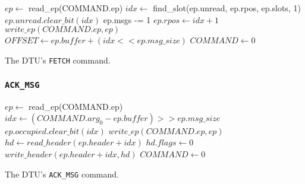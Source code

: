 \documentclass[a4paper,11pt,draft]{article}
\begin{document}
\begin{algorithm}[H]
    $ep \gets$ read\_ep(COMMAND.ep)\;
    \BlankLine
    $idx \gets$ find\_slot(ep.unread, ep.rpos, ep.slots, 1)\;
    $ep.unread.clear\_bit(idx)$\;
    ep.msgs -= 1\;
    $ep.rpos \gets idx + 1$\;
    $write\_ep(COMMAND.ep, ep)$\;
    \BlankLine
    $OFFSET \gets ep.buffer + (idx << ep.msg\_size)$\;
    $COMMAND \gets 0$\;
    \caption{The DTU's \texttt{FETCH} command.}
\end{algorithm}

\subsubsection{\texttt{ACK\_MSG}}

\begin{algorithm}[H]
    $ep \gets$ read\_ep(COMMAND.ep)\;
    \BlankLine
    $idx \gets (COMMAND.arg_0 - ep.buffer) >> ep.msg\_size$\;
    $ep.occupied.clear\_bit(idx)$\;
    $write\_ep(COMMAND.ep, ep)$\;
    \BlankLine
    $hd \gets read\_header(ep.header + idx)$\;
    $hd.flags \gets 0$\;
    $write\_header(ep.header + idx, hd)$\;
    \BlankLine
    $COMMAND \gets 0$\;
    \caption{The DTU's \texttt{ACK\_MSG} command.}
\end{algorithm}
\end{document}
